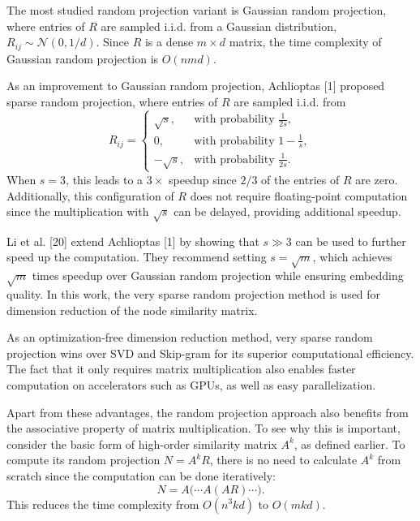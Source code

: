 \documentclass[11pt]{article}
\begin{document}
The most studied random projection variant is Gaussian random projection, where entries of $R$ are sampled i.i.d. from a Gaussian distribution, $R_{ij} \sim \mathcal{N}(0,1/d)$. Since $R$ is a dense $m \times d$ matrix, the time complexity of Gaussian random projection is $O(nmd)$.

As an improvement to Gaussian random projection, Achlioptas [1] proposed sparse random projection, where entries of $R$ are sampled i.i.d. from
\begin{equation}
R_{ij} =
\begin{cases}
\sqrt{s}, & \text{with probability } \frac{1}{2s}, \\
0, & \text{with probability } 1 - \frac{1}{s}, \\
-\sqrt{s}, & \text{with probability } \frac{1}{2s}.
\end{cases}
\end{equation}
When $s=3$, this leads to a $3\times$ speedup since $2/3$ of the entries of $R$ are zero. Additionally, this configuration of $R$ does not require floating-point computation since the multiplication with $\sqrt{s}$ can be delayed, providing additional speedup.

Li et al. [20] extend Achlioptas [1] by showing that $s \gg 3$ can be used to further speed up the computation. They recommend setting $s=\sqrt{m}$, which achieves $\sqrt{m}$ times speedup over Gaussian random projection while ensuring embedding quality. In this work, the very sparse random projection method is used for dimension reduction of the node similarity matrix.

As an optimization-free dimension reduction method, very sparse random projection wins over SVD and Skip-gram for its superior computational efficiency. The fact that it only requires matrix multiplication also enables faster computation on accelerators such as GPUs, as well as easy parallelization.

Apart from these advantages, the random projection approach also benefits from the associative property of matrix multiplication. To see why this is important, consider the basic form of high-order similarity matrix $A^k$, as defined earlier. To compute its random projection $N=A^kR$, there is no need to calculate $A^k$ from scratch since the computation can be done iteratively:
\begin{equation}
N = A\bigl(\cdots A(A R)\cdots\bigr).
\end{equation}
This reduces the time complexity from $O(n^3kd)$ to $O(mkd)$.
\end{document}
